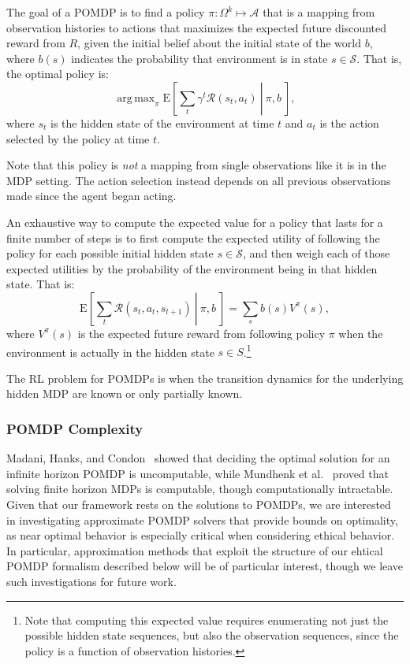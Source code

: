 \documentclass[11pt]{article}
\DeclareMathOperator*{\argmax}{arg\,max}
\begin{document}
The goal of a POMDP is to find a policy $\pi : \Omega^k \mapsto \mathcal{A}$ that is a mapping from observation histories to actions that maximizes the expected future discounted reward from $R$, given the initial belief about the initial state of the world $b$, where $b(s)$ indicates the probability that environment is in state $s \in \mathcal{S}$. That is, the optimal policy is:
\begin{equation}
\argmax_\pi \left.\text{E}\left[\sum_t \gamma^t \mathcal{R}(s_t,a_t)\ \right|\ \pi, b\ \right],
\end{equation}
where $s_t$ is the hidden state of the environment at time $t$ and $a_t$ is the action selected by the policy at time $t$. 

Note that this policy is {\em not} a mapping from single observations like it is in the MDP setting. The action selection instead depends on all previous observations made since the agent began acting.

An exhaustive way to compute the expected value for a policy that lasts for a finite number of steps is to first compute the expected utility of following the policy for each possible initial hidden state $s \in \mathcal{S}$, and then weigh each of those expected utilities by the probability of the environment being in that hidden state. That is:
\begin{equation}
\left.\text{E}\left[\sum_t \mathcal{R}(s_t,a_t,s_{t+1})\ \right|\ \pi, b\ \right] = \sum_s b(s) V^\pi(s),
\end{equation}
where $V^\pi(s)$ is the expected future reward from following policy $\pi$ when the environment is actually in the hidden state $s \in S$.\footnote{Note that computing this expected value requires enumerating not just the possible hidden state sequences, but also the observation sequences, since the policy is a function of observation histories.}

The RL problem for POMDPs is when the transition dynamics for the underlying hidden MDP are known or only partially known.

\subsubsection{POMDP Complexity}
Madani, Hanks, and Condon~ showed that deciding the optimal solution for an infinite horizon POMDP is uncomputable, while Mundhenk et al.~ proved that solving finite horizon MDPs is computable, though computationally intractable. Given that our framework rests on the solutions to POMDPs, we are interested in investigating approximate POMDP solvers that provide bounds on optimality, as near optimal behavior is especially critical when considering ethical behavior. In particular, approximation methods that exploit the structure of our ehtical POMDP formalism described below will be of particular interest, though we leave such investigations for future work.
\end{document}
